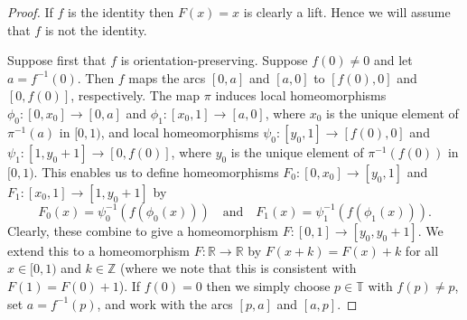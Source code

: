 \documentclass[12pt]{article}
\theoremstyle{definition}
\theoremstyle{remark}
\begin{document}
\begin{proof}
If $f$ is the identity then $F(x)=x$ is clearly a lift. Hence we will assume that $f$ is not the identity.

Suppose first that $f$ is orientation-preserving.
Suppose $f(0) \ne 0$
and let $a = f^{-1}(0)$. Then $f$ maps the arcs $[0,a]$ and $[a,0]$ to $[f(0),0]$ and $[0,f(0)]$, respectively.
The map $\pi$ induces 
local homeomorphisms
$\phi_0 : [0,x_0] \to [0,a]$
and
$\phi_1 : [x_0,1] \to [a,0]$,
where $x_0$ is the unique element of $\pi^{-1}(a)$ in $[0,1)$,
and 
local homeomorphisms
$\psi_0: [y_0,1] \to [f(0),0]$
and 
$\psi_1 : [1,y_0+1] \to [0,f(0)]$,
where $y_0$ is the unique element of $\pi^{-1}(f(0))$ in $[0,1)$.
This enables us to define homeomorphisms $F_0 : [0,x_0]  \to [y_0,1]$
and $F_1 : [x_0,1] \to [1,y_0+1]$
by 
\[
F_0(x) =  \psi_0^{-1}(f(\phi_0(x))) \quad \text{and} \quad
F_1(x) =  \psi_1^{-1}(f(\phi_1(x))).
\]
Clearly, these combine to give a homeomorphism $F : [0,1] \to [y_0,y_0+1]$.
We extend this to a homeomorphism $F : \mathbb R \to \mathbb R$
by $F(x+k) = F(x) +k$ for all $x \in [0,1)$ and $k \in \mathbb Z$
(where we note that this is consistent with $F(1)=F(0)+1$).
If $f(0)=0$ then we simply choose $p \in \mathbb T$ with $f(p) \ne p$, set $a = f^{-1}(p)$,
and work with the arcs $[p,a]$ and $[a,p]$. 


\end{proof}
\end{document}
